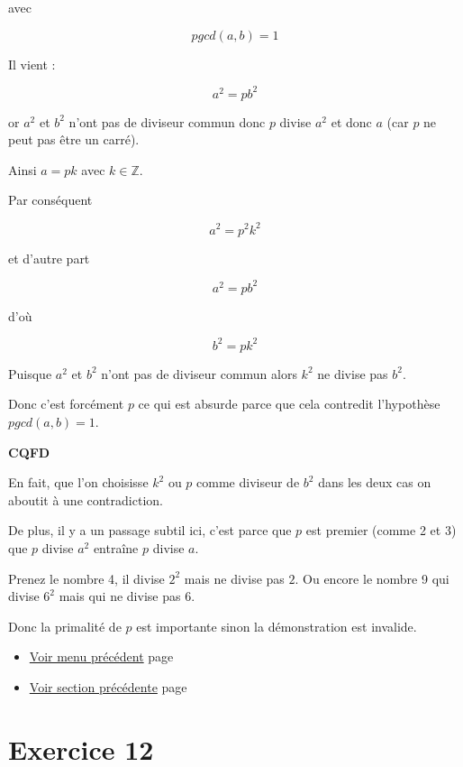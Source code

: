 \documentclass[a4paper,11pt]{book}
\begin{document}
avec

\[pgcd(a, b) = 1\]

Il vient :

\[a^2 = pb^2\]

or \(a^2\) et \(b^2\) n'ont pas de diviseur commun donc \(p\) divise
\(a^2\) et donc \(a\) (car \(p\) ne peut pas être un carré).

Ainsi \(a = pk\) avec \(k\in\mathbb{Z}\).

Par conséquent

\[a^2 = p^2k^2\]

et d'autre part

\[a^2 = pb^2\]

d'où

\[b^2 = pk^2\]

Puisque \(a^2\) et \(b^2\) n'ont pas de diviseur commun alors \(k^2\) ne
divise pas \(b^2\).

Donc c'est forcément \(p\) ce qui est absurde parce que cela contredit
l'hypothèse \(pgcd(a, b) = 1\).

\textbf{CQFD}

\newpage

En fait, que l'on choisisse \(k^2\) ou \(p\) comme diviseur de \(b^2\)
dans les deux cas on aboutit à une contradiction.

De plus, il y a un passage subtil ici, c'est parce que \(p\) est
premier (comme 2 et 3) que \(p\)
divise \(a^2\) entraîne \(p\) divise \(a\).


Prenez le nombre 4, il divise \(2^2\) mais ne divise pas \(2\). Ou
encore le nombre 9 qui divise \(6^2\) mais qui ne divise pas 6.

Donc la primalité de \(p\) est importante sinon la
démonstration est invalide.



\begin{itemize}
\item \hyperref[orgc112f4f]{Voir menu précédent}
page~\pageref{page:content6-menu}
\item \hyperref[org1486a04]{Voir section précédente}
page~\pageref{page:sec2.6.5exo11}
\end{itemize}


\clearpage

\section{Exercice 12}
\label{sec:org7db9ebf}
\label{org677ae69}
\label{page:sec2.6.7exo12}
\end{document}
